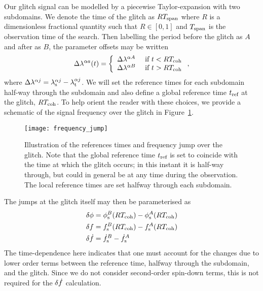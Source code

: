 \documentclass[../full_thesis/full_thesis.tex]{subfiles}
\begin{document}
Our glitch signal can be modelled by a piecewise Taylor-expansion with two
subdomains. We denote the time of the glitch as $RT_{\mathrm{span}}$ where $R$
is a dimensionless fractional quantity such that $R\in[0, 1]$ and $T_{\mathrm{span}}$ is
the observation time of the search.
Then labelling the period before the glitch as $A$ and after as
$B$, the parameter offsets may be written
\begin{align}
\Delta\lambda^{\alpha a}(t) = \left\{
\begin{array}{lc}
\Delta\lambda^{\alpha A} & \textrm{ if } t < RT_{\mathrm{coh}}\\
\Delta\lambda^{\alpha B} & \textrm{ if } t > RT_{\mathrm{coh}}
\end{array}
\right.,
\label{eqn: delta lambda alpha glitch}
\end{align}
where $\Delta\lambda^{\alpha j} = {\lambda}_\textrm{s}^{\alpha j} - {\lambda}_\textrm{t}^{\alpha j}$. We will set the
reference times for each subdomain half-way through the subdomain and also define a global
reference time $t_{\textrm{ref}}$ at the glitch, $RT_{\mathrm{coh}}$. To help orient the reader with
these choices, we provide a schematic of the signal frequency over the glitch
in Figure~\ref{fig: frequency jump}.
\begin{figure}[htb]
\centering
\texttt{[image: frequency\_jump]}
\caption{Illustration of the references times and frequency jump over the glitch.
Note that the global reference time $t_{\textrm{ref}}$ is set to coincide with the time
at which the glitch occurs; in this instant it is half-way through, but could
in general be at any time during the observation. The local reference times are
set halfway through each subdomain.}
\label{fig: frequency jump}
\end{figure}

The jumps at the glitch itself may then be parameterised as
\begin{align}
\begin{split}
\delta\phi & =  \phi_{\textrm{s}}^{B}(RT_{\mathrm{coh}}) - \phi_{\textrm{s}}^{A}(RT_{\mathrm{coh}})\\
\delta f & =  f_{\textrm{s}}^{B}(RT_{\mathrm{coh}}) - f_{\textrm{s}}^{A}(RT_{\mathrm{coh}})\\
\delta\dot{f} & =  \dot{f}_{\textrm{s}}^{B} - \dot{f}_{\textrm{s}}^{A}
\end{split}
\label{eqn: glitch jumps}
\end{align}
The time-dependence here indicates that one must account for the
changes due to lower order terms between the reference time, halfway through
the subdomain, and the glitch. Since we do not consider second-order spin-down
terms, this is not required for the $\delta\dot{f}$ calculation.
\end{document}
